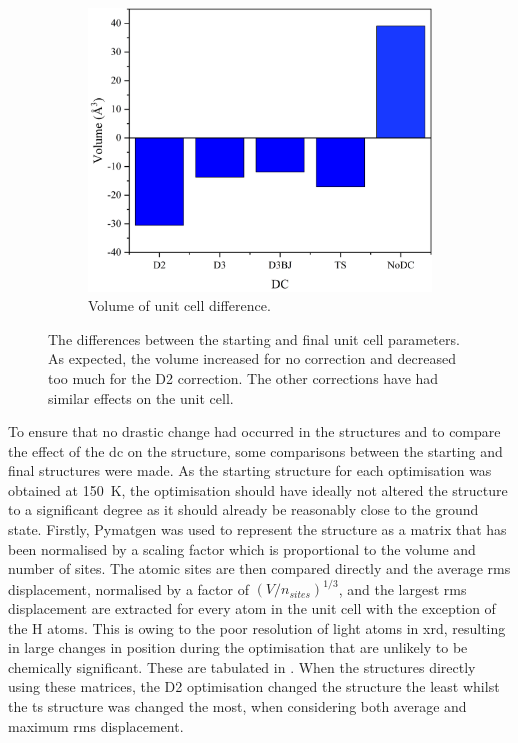\begin{figure}[!htb]
\begin{subfigure}{0.49\textwidth}
\centering
\includegraphics[width=\textwidth]{Figures/Analysis/IVDW/volchangebar.png}
\caption{Volume of unit cell difference.}
\label{fig:volchange}
\end{subfigure}

\captionsetup{font = footnotesize, justification = centering}
\caption[Differences between the Starting and Final Unit Cell Parameters]{The differences between the starting and final unit cell parameters. As expected, the volume increased for no correction and decreased too much for the D2 correction. The other corrections have had similar effects on the unit cell.}
\label{Fig:UnitCellParams}
\end{figure}

To ensure that no drastic change had occurred in the structures and to compare the effect of the \acrshort{dc} on the structure, some comparisons between the starting and final structures were made. As the starting structure for each optimisation was obtained at \SI{150}{K}, the optimisation should have ideally not altered the structure to a significant degree as it should already be reasonably close to the ground state. Firstly, Pymatgen \cite{Ong2013} was used to represent the structure as a matrix that has been normalised by a scaling factor which is proportional to the volume and number of sites. The atomic sites are then compared directly and the average \acrshort{rms} displacement, normalised by a factor of \((V/n_{sites})^{1/3}\), and the largest \acrshort{rms} displacement are extracted for every atom in the unit cell with the exception of the H atoms. This is owing to the poor resolution of light atoms in \acrshort{xrd}, resulting in large changes in position during the optimisation that are unlikely to be chemically significant. These are tabulated in . When the structures directly using these matrices, the D2 optimisation changed the structure the least whilst the \acrshort{ts} structure was changed the most, when considering both average and maximum \acrshort{rms} displacement.

